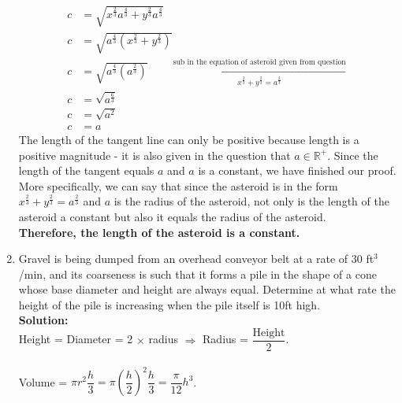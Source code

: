 \documentclass[12pt]{book}
\begin{document}
\begin{enumerate}
\begin{align}
    c &= \sqrt{x^{\frac{2}{3}} a^{\frac{4}{3}} + y^{\frac{2}{3}} a^{\frac{4}{3}}} \\
    c &= \sqrt{a^{\frac{4}{3}} \left( x^{\frac{2}{3}} + y^{\frac{2}{3}} \right)} \\
    c &= \sqrt{a^{\frac{4}{3}} \left( a^{\frac{2}{3}}\right)} \qquad \xleftarrow[x^{\frac{2}{3}} + y^{\frac{2}{3}} = a^{\frac{2}{3}}]{\text{sub in the equation of asteroid given from question}}\\
    c &= \sqrt{a^{\frac{6}{3}}} \\
    c &= \sqrt{a^{2}} \\
    c &= a
\end{align}
The length of the tangent line can only be positive because length is a positive magnitude - it is also given in the question that $a \in \mathbb{R^+}$. Since the length of the tangent equals $a$ and $a$ is a constant, we have finished our proof. \\

More specifically, we can say that since the asteroid is in the form $x^{\frac{2}{3}} + y^{\frac{2}{3}} = a^{\frac{2}{3}}$ and $a$ is the radius of the asteroid, not only is the length of the asteroid a constant but also it equals the radius of the asteroid.\\

\textbf{Therefore, the length of the asteroid is a constant.}






\newpage

\item Gravel is being dumped from an overhead conveyor belt at a rate of 30 ft$^3$/min, and its coarseness is such that it forms a pile in the shape of a cone whose base diameter and height are always equal. Determine at what rate the height of the pile is increasing when the pile itself is 10ft high.\\

\textbf{Solution:}\\
Height = Diameter = 2 $ \times$ radius $\Longrightarrow$ Radius = $\dfrac{\text{Height}}{2}$.\\\\
Volume = $\pi r^2 \dfrac{h}{3} = \pi \left(\dfrac{h}{2}\right)^2 \dfrac{h}{3} = \dfrac{\pi}{12}h^3$.\\


\end{enumerate}
\end{document}
